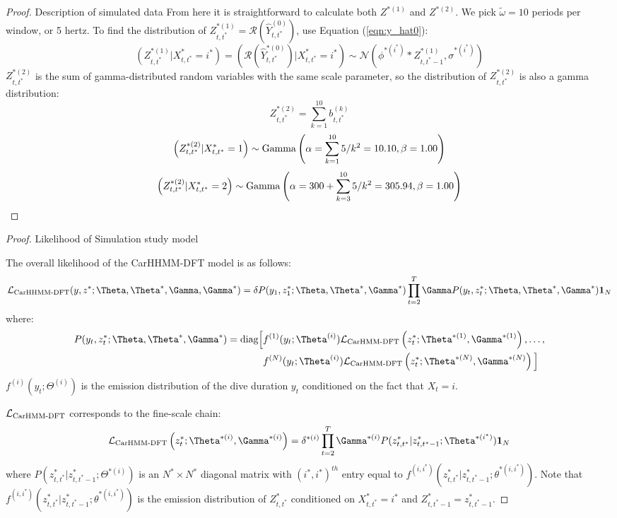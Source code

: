 \begin{proof}{Description of simulated data}{}
From here it is straightforward to calculate both $Z^{*(1)}$ and $Z^{*(2)}$. We pick $\tilde{\omega} = 10$ periods per window, or 5 hertz. To find the distribution of $Z^{*(1)}_{t,t^*} = \mathcal{R}\left(\hat{Y}^{(0)}_{t,t^*}\right)$, use Equation (\ref{eqn:y_hat0}):
%
$$\left(Z^{*(1)}_{t,t^*} | X^*_{t,t^*} = i^* \right) = \left(\mathcal{R}\left(\hat{Y}^{*(0)}_{t,t^*}\right) | X^*_{t,t^*} = i^* \right) \sim \mathcal{N} \left(\phi^{*(i^*)} * Z^{*(1)}_{t,t^*-1}, \sigma^{*(i^*)} \right)$$
%
$Z^{*(2)}_{t,t^*}$ is the sum of gamma-distributed random variables with the same scale parameter, so the distribution of $Z^{*(2)}_{t,t^*}$ is also a gamma distribution:
%
$$Z^{*(2)}_{t,t^*} = \sum_{k=1}^{10} b^{(k)}_{t,t^*}$$
%
$$\left(Z^{*(2)}_{t,t^*}|X^*_{t,t^*} = 1\right) \sim {\rm{Gamma}}\left(\alpha = \sum_{k=1}^{10} 5/k^2 = 10.10, \beta = 1.00 \right)$$
%
$$\left(Z^{*(2)}_{t,t^*}|X^*_{t,t^*} = 2\right) \sim {\rm{Gamma}}\left(\alpha = 300 + \sum_{k=3}^{10} 5/k^2 = 305.94 , \beta = 1.00 \right)$$
\end{proof}

\begin{proof}{Likelihood of Simulation study model}{}

The overall likelihood of the CarHHMM-DFT model is as follows:
%
$$\calL_{\text{CarHHMM-DFT}}(y,z^*;\Theta,\Theta^*,\Gamma,\Gamma^*) = \delta P(y_1,z_1^*;\Theta,\Theta^*,\Gamma^*) \prod_{t=2}^T \Gamma P(y_t,z_t^*;\Theta,\Theta^*,\Gamma^*) \mathbf{1}_N$$
%
where:
%
\begin{align*}
P(y_t,z_t^*;\Theta,\Theta^*,\Gamma^*)  = \text{diag}\Big[&f^{(1)}(y_t;\Theta^{(i)})\calL_{\text{CarHMM-DFT}}\left(z_t^*;\Theta^{*(1)},\Gamma^{*(1)}\right), \ldots , \\
&f^{(N)}(y_t;\Theta^{(i)})\calL_{\text{CarHMM-DFT}}\left(z_t^*;\Theta^{*(N)},\Gamma^{*(N)}\right) \Big]
\end{align*}
%
$f^{(i)}(y_t;\Theta^{(i)})$ is the emission distribution of the dive duration $y_t$ conditioned on the fact that $X_t = i$.

$\mathcal{L}_{\text{CarHMM-DFT}}$ corresponds to the fine-scale chain:
%
$$\calL_{\text{CarHMM-DFT}}\left(z_t^*;\Theta^{*(i)},\Gamma^{*(i)}\right) = \delta^{*(i)} \prod_{t=2}^T \Gamma^{*(i)} P(z^*_{t,t^*}|z^*_{t,t^*-1};\Theta^{*(i^*)}) \mathbf{1}_N$$
%
where $P(z^*_{t,t^*}|z^*_{t,t^*-1};\Theta^{*(i)})$ is an $N^* \times N^*$ diagonal matrix with $(i^*,i^*)^{th}$ entry equal to $f^{(i,i^*)}(z^*_{t,t^*}|z^*_{t,t^*-1}; \theta^{*(i,i^*)})$.
%
Note that $f^{(i,i^*)}(z^*_{t,t^*}|z^*_{t,t^*-1}; \theta^{*(i,i^*)})$ is the emission distribution of $Z^*_{t,t^*}$ conditioned on $X^*_{t,t^*} = i^*$ and $Z^*_{t,t^*-1} = z^*_{t,t^*-1}$.

\end{proof}

